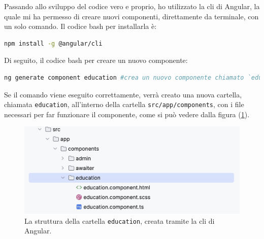 Passando allo sviluppo del codice vero e proprio, ho utilizzato la \acrshort{cli} di Angular, la quale mi ha permesso di creare nuovi componenti, direttamente da terminale, con un solo comando. Il codice bash per installarla è:
\begin{lstlisting}[language=bash, linewidth=20cm, basicstyle=\tiny]
npm install -g @angular/cli
\end{lstlisting}

Di seguito, il codice bash per creare un nuovo componente:
\begin{lstlisting}[language=bash, linewidth=20cm, basicstyle=\tiny]
ng generate component education #crea un nuovo componente chiamato `educationComponent', per gestire i corsi formativi, dal punto di vista di un utente base
\end{lstlisting}

Se il comando viene eseguito correttamente, verrà creato una nuova cartella, chiamata \texttt{education}, all'interno della cartella \texttt{src/app/components}, con i file necessari per far funzionare il componente, come si può vedere dalla figura (\ref{fig:education}).
\begin{figure}[H]
\centering
\includegraphics[width=1\textwidth]{Images/education.jpg}
\caption{\label{fig:education}La struttura della cartella \texttt{education}, creata tramite la \acrshort{cli} di Angular.}
\end{figure}

